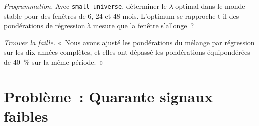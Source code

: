 \begin{exercise}[$\star\star\star$]\label{exo:rs:signal-combination:7}
\emph{Programmation.} Avec \texttt{small\_universe}, déterminer le $\lambda$ optimal dans le monde stable pour des fenêtres de 6, 24 et 48 mois. L'optimum se rapproche-t-il
des pondérations de régression à mesure que la fenêtre s'allonge~?
\end{exercise}

\begin{exercise}[$\star\star\star$]\label{exo:rs:signal-combination:8}
\emph{Trouver la faille.} «~Nous avons ajusté les pondérations du mélange par régression sur les dix années complètes, et elles ont dépassé les pondérations équipondérées de 40~\% sur la même période.~»
\end{exercise}

\section{Problème~: Quarante signaux faibles}

